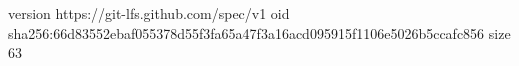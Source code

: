 version https://git-lfs.github.com/spec/v1
oid sha256:66d83552ebaf055378d55f3fa65a47f3a16acd095915f1106e5026b5ccafc856
size 63
